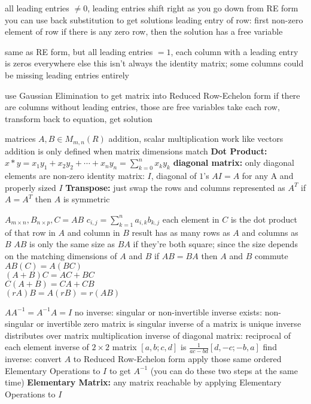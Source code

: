 \documentclass[12pt]{article}
\begin{document}
\begin{multicols*}{2}
\begin{flushleft}
\begin{outline}[longenum]
  \1 all leading entries $\not= 0$, leading entries shift right as you go down
  \1 from RE form you can use back substitution to get solutions
  \1 leading entry of row: first non-zero element of row
  \1 if there is any zero row, then the solution has a free variable

  \1 same as RE form, but all leading entries $=1$, each column with a leading entry is zeros everywhere else
    \2 this isn't always the identity matrix; some columns could be missing leading entries entirely

  \1 use Gaussian Elimination to get matrix into Reduced Row-Echelon form
  \1 if there are columns without leading entries, those are free variables
  \1 take each row, transform back to equation, get solution

  \1 matrices $A,B \in M_{m,n}(R)$
  \1 addition, scalar multiplication work like vectors
    \2 addition is only defined when matrix dimensions match
  \1 \textbf{Dot Product:} $x*y = x_1 y_1 + x_2 y_2 + \cdots + x_n y_n = \sum_{k=0}^{n} x_k y_k$
  \1 \textbf{diagonal matrix:} only diagonal elements are non-zero
  \1 identity matrix: $I$, diagonal of $1$'s
    \2 $AI=A$ for any A and properly sized $I$
  \1 \textbf{Transpose:} just swap the rows and columns
    \2 represented as $A^T$
    \2 if $A=A^T$ then $A$ is symmetric

 $A_{m \times n}, B_{n \times p}, C=AB$
  \1 $c_{i,j} = \sum_{k=1}^{n} a_{i,k}b_{k,j}$
  \1 each element in $C$ is the dot product of that row in $A$ and column in $B$
  \1 result has as many rows as $A$ and columns as $B$
  \1 $AB$ is only the same size as $BA$ if they're both square; since the size depends on the matching dimensions of $A$ and $B$
  \1 if $AB=BA$ then $A$ and $B$ commute
  \1 $AB(C) = A(BC)$
  \\ $(A+B)C = AC+BC$
  \\ $C(A+B) = CA+CB$
  \\ $(rA)B = A(rB) = r(AB)$

  \1 $AA^{-1} = A^{-1}A = I$
  \1 no inverse: singular or non-invertible
  \1 inverse exists: non-singular or invertible
  \1 zero matrix is singular
  \1 inverse of a matrix is unique
  \1 inverse distributes over matrix multiplication
  \1 inverse of diagonal matrix: reciprocal of each element
  \1 inverse of $2\times 2$ matrix $[a,b;c,d]$ is $\frac{1}{ac-bd}[d,-c;-b,a]$
  \1 find inverse:
    \2 convert $A$ to Reduced Row-Echelon form
    \2 apply those same ordered Elementary Operations to $I$ to get $A^{-1}$
    \2 (you can do these two steps at the same time)
  \1 \textbf{Elementary Matrix:} any matrix reachable by applying Elementary Operations to $I$


\end{outline}
\end{flushleft}
\end{multicols*}
\end{document}
